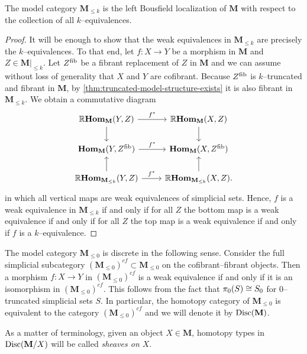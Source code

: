 \begin{corollary}\label{cor:weak-equiv-level}
  The model category \(\mathbf M_{\leq k}\) is the left Bousfield
  localization of \(\mathbf M\) with respect to the collection of all
  \(k\)--equivalences.
\end{corollary}
\begin{proof}
  It will be enough to show that the weak equivalences in \(\mathbf
  M_{\leq k}\) are precisely the \(k\)--equivalences. To that end, let
  \(f\colon X\to Y\) be a morphism in \(\mathbf M\) and \(Z\in\mathbf
  M|_{\leq k}\). Let \(Z^{\operatorname{\textnormal{fib}}}\) be a fibrant replacement of \(Z\) in
  \(\mathbf M\) and we can assume without loss of generality that
  \(X\) and \(Y\) are cofibrant. Because \(Z^{\operatorname{\textnormal{fib}}}\) is
  \(k\)--truncated and fibrant in \(\mathbf M\), by
  \autoref{thm:truncated-model-structure-exists} it is also fibrant in
  \(\mathbf M_{\leq k}\). We obtain a commutative diagram
  \[
  \begin{tikzcd}
    \RHom_{\mathbf M}(Y, Z) \arrow[r, "f^{*}"] \arrow[d] & \RHom_{\mathbf M}(X, Z) \arrow[d] \\
    \Hom_{\mathbf M}(Y, Z^{\fib}) \arrow[r, "f^{*}"] & \Hom_{\mathbf M}(X, Z^{\fib}) \\
    \RHom_{\mathbf M_{\leq k}}(Y, Z) \arrow[r, "f^{*}"] \arrow[u] & \RHom_{\mathbf M_{\leq k}}(X, Z). \arrow[u]
  \end{tikzcd}
  \]
  in which all vertical maps are weak equivalences of simplicial
  sets. Hence, \(f\) is a weak equivalence in \(\mathbf M_{\leq k}\)
  if and only if for all \(Z\) the bottom map is a weak equivalence if
  and only if for all \(Z\) the top map is a weak equivalence if and
  only if \(f\) is a \(k\)--equivalence.
\end{proof}

\begin{remark}
  The model category \(\mathbf M_{\leq 0}\) is discrete in the
  following sense. Consider the full simplicial subcategory \((\mathbf
  M_{\leq 0})^{cf}\subset \mathbf M_{\leq 0}\) on the
  cofibrant--fibrant objects. Then a morphism \(f\colon X\to Y\) in
  \((\mathbf M_{\leq 0})^{cf}\) is a weak equivalence if and only if
  it is an isomorphism in \((\mathbf M_{\leq 0})^{cf}\). This follows
  from the fact that \(\pi_{0}(S) \cong S_{0}\) for \(0\)--truncated
  simplicial sets \(S\). In particular, the homotopy category of
  \(\mathbf M_{\leq 0}\) is equivalent to the category \((\mathbf
  M_{\leq 0})^{cf}\) and we will denote it by \(\operatorname{\textnormal{Disc}}(\mathbf M)\).

  As a matter of terminology, given an object \(X\in\mathbf M\),
  homotopy types in \(\operatorname{\textnormal{Disc}}(\mathbf M/X)\) will be called
  \emph{sheaves on \(X\)}.
\end{remark}

